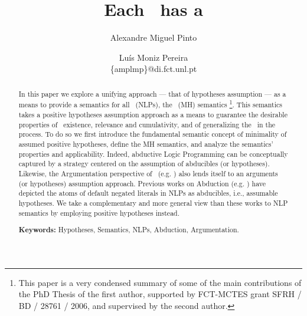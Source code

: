 \documentclass{llncs}
\author{Alexandre Miguel Pinto \and Lu\'is Moniz Pereira \\
		\{amplmp\}@di.fct.unl.pt}
\title{Each \nlp\ has a \twov\\ \MHs}
\institute{Centro de Intelig\^encia Artificial (CENTRIA), Departamento de Inform\'atica\\
		Faculdade de Ci\^encias e Tecnologia, Universidade Nova de Lisboa\\
		2829-516 Caparica, Portugal}
\begin{document}
	\maketitle
	\begin{abstract}
		In this paper we explore a unifying approach --- that of hypotheses assumption --- as a means to provide a semantics for all \NLPs\ 
		(NLPs), the \MH\ (MH) semantics
		\footnote{	This paper is a very condensed summary of some of the main contributions of the PhD Thesis \cite{PHDAMP} of the first author, supported by FCT-MCTES grant SFRH / BD / 28761 / 2006, and supervised by the second author.}.
		This semantics takes a positive hypotheses assumption approach as a means to guarantee the desirable properties of \m\ existence,
		relevance and cumulativity, and of generalizing the \SMss\ in the process.
		To do so we first introduce the fundamental semantic concept of minimality of assumed positive hypotheses, define the MH semantics, and
		analyze the semantics' properties and applicability. 
		Indeed, abductive Logic Programming can be conceptually captured by a strategy centered on the assumption of abducibles (or hypotheses).
		Likewise, the Argumentation perspective of \LPs\ (e.g. \cite{dung95acceptability}) also lends itself to an arguments (or hypotheses)
		assumption approach.
		Previous works on Abduction (e.g. \cite{DBLP:journals/logcom/KakasKT92}) have depicted the atoms of default
		negated literals in NLPs as abducibles, i.e., assumable hypotheses.
		We take a complementary and more general view than these works to NLP semantics by employing positive hypotheses instead.		
		
		{\bf Keywords:} Hypotheses, Semantics, NLPs, Abduction, Argumentation.
	\end{abstract}
	
\end{document}
